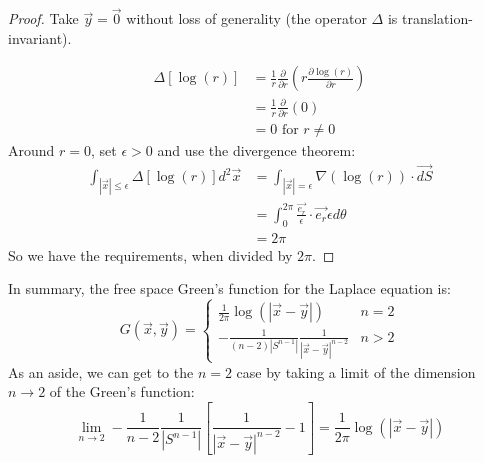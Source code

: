 \documentclass[../Main.tex]{subfiles}
\begin{document}
\begin{proof}
    Take $\vec{y} = \vec{0}$ without loss of generality (the operator $\Delta$ is translation-invariant).

    \begin{align*}
        \Delta[\log(r)] &= \frac1r \frac{\partial}{\partial r} \left(r \frac{\partial \log(r)}{\partial r}\right) \\
        &= \frac1r \frac{\partial}{\partial r} \left(0\right) \\
        &= 0 \text{ for $r \neq 0$}
    \end{align*}
    Around $r = 0$, set $\epsilon > 0$ and use the divergence theorem:
    \begin{align*}
        \int_{|\vec{x}| \leq \epsilon} \Delta[\log(r)] d^2 \vec{x}&= \int_{|\vec{x}| = \epsilon} \nabla (\log(r)) \cdot \vec{dS} \\
        &= \int_0^{2\pi} \frac{\vec{e_r}}{\epsilon} \cdot \vec{e_r} \epsilon d\theta \\
        &= 2\pi
    \end{align*}
    So we have the requirements, when divided by $2\pi$.
\end{proof}
In summary, the free space Green's function for the Laplace equation is:
\begin{equation}
    G(\vec{x}, \vec{y}) =
    \begin{cases}
        \frac1{2\pi} \log(|\vec{x} - \vec{y}|) & n = 2 \\
        -\frac{1}{(n-2) |S^{n-1}|} \frac{1}{|\vec{x} - \vec{y}|^{n-2}} & n > 2
    \end{cases}
    \label{eqnFreeGreen}
\end{equation}
As an aside, we can get to the $n = 2$ case by taking a limit of the dimension $n \to 2$ of the Green's function:
\begin{equation*}
    \lim_{n \to 2} -\frac{1}{n-2} \frac{1}{|S^{n-1}|} \left[\frac{1}{|\vec{x} - \vec{y}|^{n-2}} - 1\right] = \frac1{2\pi} \log(|\vec{x} - \vec{y}|)
\end{equation*}
\end{document}
